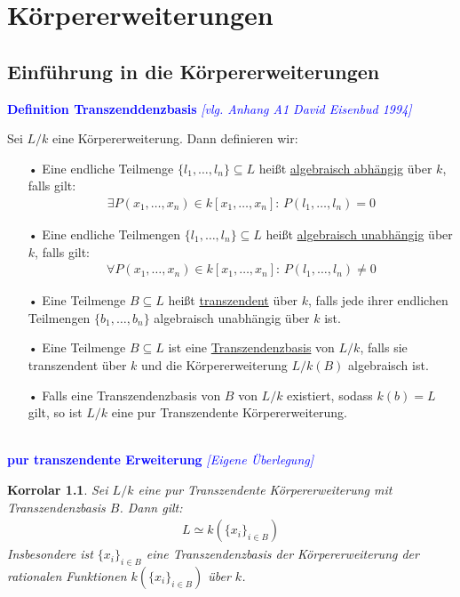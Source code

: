 \documentclass[10pt,a4paper]{report}
\newcommand{\ModulsOfDifferenzials}{David Eisenbud 1994}
\newcounter{Aussage}[chapter]
\newtheorem{korrolar}[Aussage]{Korrolar}
\begin{document}
\chapter{Körpererweiterungen}
\section{Einführung in die Körpererweiterungen}
\textcolor{blue}{\textbf{Definition Transzenddenzbasis} \textit{[vlg. Anhang A1 \ModulsOfDifferenzials]}}
\begin{def}\label{Definition Transzenddenzbasis}
Sei $L/k$ eine Körpererweiterung. Dann definieren wir:
\begin{itemize}
\item[•] Eine endliche Teilmenge $\lbrace l_1, \dots ,l_n \rbrace \subseteq L$ heißt \underline{algebraisch abhängig} über $k$, falls gilt:
\begin{gather*}
\exists P(x_1, \dots , x_n) \in k[x_1,\dots,x_n] : \, P(l_1, \dots , l_n) = 0
\end{gather*}
\item[•] Eine endliche Teilmengen $\lbrace l_1, \dots ,l_n \rbrace \subseteq L$ heißt \underline{algebraisch unabhängig} über $k$, falls gilt:
\begin{gather*}
\forall P(x_1, \dots , x_n) \in k[x_1,\dots,x_n] : \, P(l_1, \dots , l_n) \neq 0
\end{gather*}
\item[•] Eine Teilmenge $B \subseteq L$ heißt \underline{transzendent} über $k$, falls jede ihrer endlichen Teilmengen $\lbrace b_1, \dots , b_n \rbrace$ algebraisch unabhängig über $k$ ist.
\item[•] Eine Teilmenge $B \subseteq L$ ist eine \underline{Transzendenzbasis} von $L/k$, falls sie transzendent über $k$ und die Körpererweiterung $L/k(B)$ algebraisch ist.
\item[•] Falls eine Transzendenzbasis von $B$ von $L/k$ existiert, sodass $k(b) = L$ gilt, so ist $L/k$ eine pur Transzendente Körpererweiterung.
\end{itemize}
\end{def}


\ \\
\textcolor{blue}{\textbf{pur transzendente Erweiterung} \textit{[Eigene Überlegung]}}
\begin{korrolar}\label{pur transzendente Erweiterung}
Sei $L/k$ eine pur Transzendente Körpererweiterung mit Transzendenzbasis $B$. Dann gilt:
\begin{gather*}
L \simeq k(\lbrace x_i \rbrace_{i \in B})
\end{gather*}
Insbesondere ist $\lbrace x_i \rbrace_{i \in B}$ eine Transzendenzbasis der Körpererweiterung der rationalen Funktionen $k(\lbrace x_i \rbrace_{i \in B})$ über $k$.
\end{korrolar}
\end{document}
